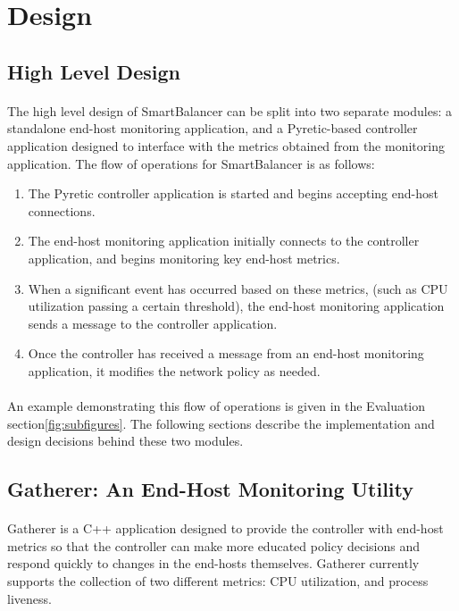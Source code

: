 \documentclass[10pt]{article}
\begin{document}
\section{Design}
\label{sec:design}

\subsection{High Level Design}

\paragraph{} The high level design of SmartBalancer can be split into two separate modules: a standalone end-host monitoring application, and a Pyretic-based controller application designed to interface with the metrics obtained from the monitoring application.  The flow of operations for SmartBalancer is as follows:
\begin{enumerate}
\item The Pyretic controller application is started and begins accepting end-host connections.
\item The end-host monitoring application initially connects to the controller application, and begins monitoring key end-host metrics.
\item When a significant event has occurred based on these metrics, (such as CPU utilization passing a certain threshold), the end-host monitoring application sends a message to the controller application.
\item Once the controller has received a message from an end-host monitoring application, it modifies the network policy as needed.
\end{enumerate}

\paragraph{} An example demonstrating this flow of operations is given in the Evaluation section\ref{fig:subfigures}. The following sections describe the implementation and design decisions behind these two modules.

\subsection{Gatherer: An End-Host Monitoring Utility}

\paragraph{} Gatherer is a C++ application designed to provide the controller with end-host metrics so that the controller can make more educated policy decisions and respond quickly to changes in the end-hosts themselves. Gatherer currently supports the collection of two different metrics: CPU utilization, and process liveness.
\end{document}

